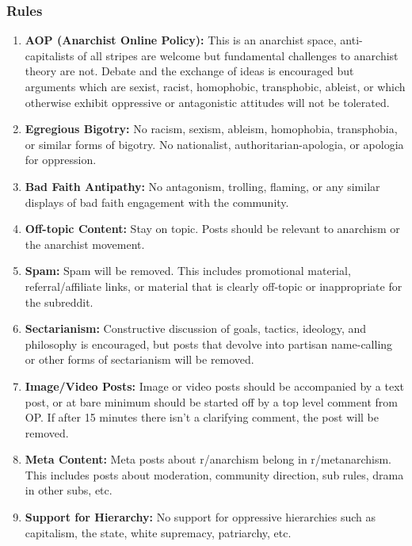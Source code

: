 \subsubsection{Rules}
\begin{enumerate}
    \item \textbf{AOP (Anarchist Online Policy):} This is an anarchist space, anti-capitalists of all stripes are welcome but fundamental challenges to anarchist theory are not. Debate and the exchange of ideas is encouraged but arguments which are sexist, racist, homophobic, transphobic, ableist, or which otherwise exhibit oppressive or antagonistic attitudes will not be tolerated.
    
    \item \textbf{Egregious Bigotry:} No racism, sexism, ableism, homophobia, transphobia, or similar forms of bigotry. No nationalist, authoritarian-apologia, or apologia for oppression.
    
    \item \textbf{Bad Faith Antipathy:} No antagonism, trolling, flaming, or any similar displays of bad faith engagement with the community.
    
    \item \textbf{Off-topic Content:} Stay on topic. Posts should be relevant to anarchism or the anarchist movement.
    
    \item \textbf{Spam:} Spam will be removed. This includes promotional material, referral/affiliate links, or material that is clearly off-topic or inappropriate for the subreddit.
    
    \item \textbf{Sectarianism:} Constructive discussion of goals, tactics, ideology, and philosophy is encouraged, but posts that devolve into partisan name-calling or other forms of sectarianism will be removed.
    
    \item \textbf{Image/Video Posts:} Image or video posts should be accompanied by a text post, or at bare minimum should be started off by a top level comment from OP. If after 15 minutes there isn't a clarifying comment, the post will be removed.
    
    \item \textbf{Meta Content:} Meta posts about r/anarchism belong in r/metanarchism. This includes posts about moderation, community direction, sub rules, drama in other subs, etc.
    
    \item \textbf{Support for Hierarchy:} No support for oppressive hierarchies such as capitalism, the state, white supremacy, patriarchy, etc.
\end{enumerate}

